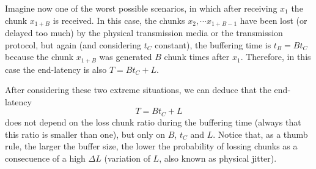 Imagine now one of the worst possible scenarios, in which after
receiving $x_1$ the chunk $x_{1+B}$ is received. In this case, the
chunks $x_2, \cdots x_{1+B-1}$ have been lost (or delayed too much) by
the physical transmission media or the transmission protocol, but
again (and considering $t_C$ constant), the buffering time is
$t_B=Bt_C$ because the chunk $x_{1+B}$ was generated $B$ chunk times
after $x_1$. Therefore, in this case the end-latency is also
$T=Bt_C+L$.

After considering these two extreme situations, we can deduce that
the end-latency
\begin{equation}
  \label{eq:end_latency}
  T=Bt_C+L
\end{equation}
does not depend on the loss chunk ratio during the buffering time
(always that this ratio is smaller than one), but only on $B$, $t_C$
and $L$. Notice that, as a thumb rule, the larger the buffer size, the
lower the probability of lossing chunks as a consecuence of a high
$\Delta L$ (variation of $L$, also known as physical jitter).


